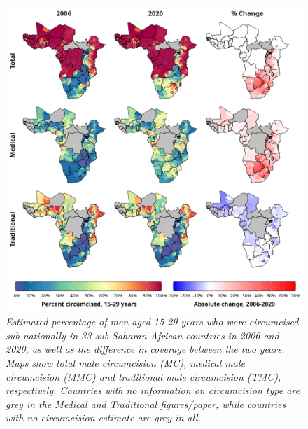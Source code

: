 \documentclass{article}
\begin{document}
\begin{figure}[H]
    \centering
    \includegraphics[width=1\linewidth]
    {figures/paper/01_map_plot_facet.png}
    \caption{\emph{Estimated percentage of men aged 15-29 years who were circumcised sub-nationally in 33 sub-Saharan African countries in 2006 and 2020, as well as the difference in coverage between the two years. Maps show total male circumcision (MC), medical male circumcision (MMC) and traditional male circumcision (TMC), respectively. Countries with no information on circumcision type are grey in the Medical and Traditional figures/paper, while countries with no circumcision estimate are grey in all.}}
\end{figure}
\end{document}
